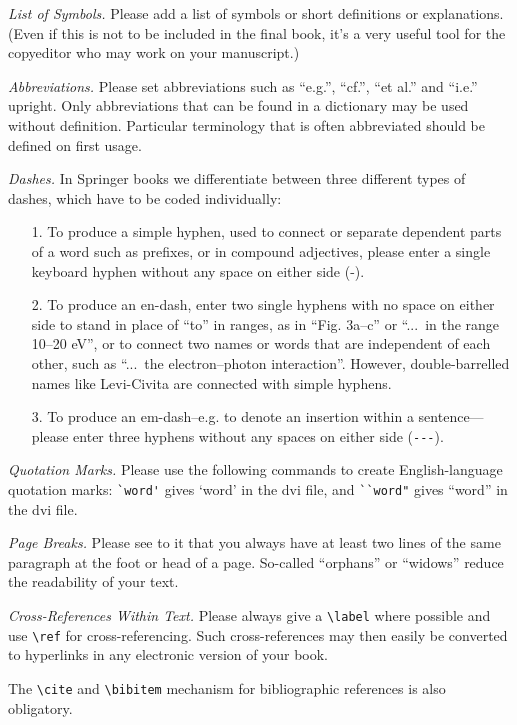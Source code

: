 \documentclass[graybox]{svmono}
\begin{document}
{\it List of Symbols.} Please add a list of symbols or short definitions or explanations. (Even if this is not to be included in the final book, it's a very useful tool for the copyeditor who may work on your manuscript.)

{\it Abbreviations.} Please set abbreviations such as ``e.g.'', ``cf.'', ``et al.'' and ``i.e.'' upright. Only abbreviations that can be found in a dictionary may be used without definition. Particular terminology that is often abbreviated should be defined on first usage.

{\it Dashes.} In Springer books we differentiate between three different types of dashes, which have to be coded individually:

\begin{enumerate}
\item[1.] To produce a simple hyphen, used to connect or separate dependent parts of a word such as prefixes, or in compound adjectives, please enter a single keyboard hyphen without any space on either side (-).
\item[2.] To produce an en-dash, enter two single hyphens with no space on either side to stand in place of ``to'' in ranges, as in ``Fig. 3a--c'' or ``...~in the range 10--20 eV'', or to connect two names or words that are independent of each other, such as ``...~the electron--photon interaction''. However, double-barrelled names like Levi-Civita are connected with simple hyphens.
\item[3.] To produce an em-dash--e.g. to denote an insertion within a sentence---please enter three hyphens without any spaces on either side (\verb|---|).
\end{enumerate}


{\it Quotation Marks.} Please use the following commands to create English-language quotation marks: \verb|`word'| gives `word' in the dvi file, and \verb|``word"| gives ``word'' in the dvi file.

{\it Page Breaks.} Please see to it that you always have at least two lines of the same paragraph at the foot or head of a page. So-called ``orphans'' or ``widows'' reduce the readability of your text.

{\it Cross-References Within Text.} Please always give a \verb|\label| where possible and use \verb|\ref| for cross-referencing. Such cross-references may then easily be converted to hyperlinks in any electronic version of your book.

The \verb|\cite| and \verb|\bibitem| mechanism for bibliographic references is also obligatory.
\end{document}
